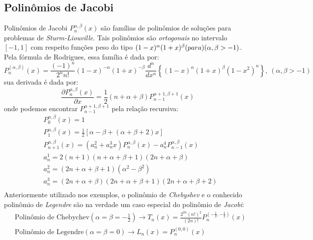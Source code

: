 \subsection{Polinômios de Jacobi}
 Polinômios de Jacobi $P^{\alpha,\beta}_n(x)$ são famílias de polinômios de soluções para problemas de \emph{Sturm-Liouville}. Tais polinômios são \emph{ortogonais} no intervalo $[-1,1]$  com respeito funções peso do tipo $(1-x)^\alpha (1+x)^\beta \text(para) (\alpha,\beta > -1)$.
Pela fórmula de Rodrigues, essa família é dada por:
\begin{equation}
P_n^{(\alpha,\beta)}(x) = \frac{(-1)^n}{2^n n!} (1-x)^{-\alpha} (1+x)^{-\beta} \frac{d^n}{dx^n} \left\{ (1-x)^\alpha (1+x)^\beta \left (1 - x^2 \right )^n \right\},\ (\alpha, \beta >-1)
\end{equation}
 sua derivada é dada por:
\begin{equation}
\frac{\partial P^{\alpha,\beta}_n (x)}{\partial x} = \frac{1}{2}(n+\alpha+\beta) P^{\alpha + 1,\beta +1}_{n-1} (x)
\end{equation}
 onde podemos encontrar $P^{\alpha + 1,\beta +1}_{n-1}$ pela relação recursiva:
\begin{align}
& P^{\alpha,\beta}_{0} (x) = 1\\
& P^{\alpha,\beta}_{1} (x) = \frac{1}{2}[\alpha - \beta + (\alpha + \beta + 2 )x]\\
& P^{\alpha,\beta}_{n+1} (x)=(a^2_n + a ^3_n x)P^{\alpha,\beta}_{n}(x) - a_n^4P^{\alpha,\beta}_{n-1}(x)  \\
& a^1_n = 2(n+1)(n+ \alpha + \beta + 1)(2n + \alpha +\beta)\\
& a^2_n = (2n + \alpha +\beta + 1)(\alpha^2 - \beta^2)\\
& a^3_n = (2n + \alpha +\beta)(2n + \alpha +\beta + 1)(2n + \alpha + \beta + 2)\\ 
\end{align}
 Anteriormente utilizado nos exemplos, o polinômio de \emph{Chebyshev} e o conhecido polinômio de \emph{Legendre} são na verdade um caso especial do polinômio de \emph{Jacobi}:
\begin{align}
& \text{Polinômio de Chebychev} (\alpha= \beta = -\frac{1}{2})  \rightarrow  T_n(x) =\frac{2^{2n}(n!)^2}{ (2n)!} P^{(-\frac{1}{2},-\frac{1}{2})}_{n}(x) \\
& \text{Polinômio de Legendre} (\alpha= \beta = 0)  \rightarrow L_n(x) =  P^{(0,0)}_{n}(x)
\end{align}
 
